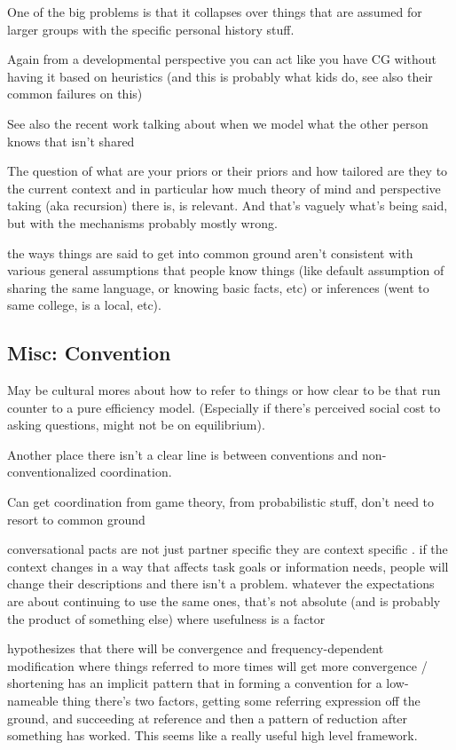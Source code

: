 \documentclass[]{article}
\begin{document}
One of the big problems is that it collapses over things that are assumed for larger groups with the specific personal history stuff. 



Again from a developmental perspective you can act like you have CG without having it based on heuristics (and this is probably what kids do, see also their common failures on this) 

See also the recent work talking about when we model what the other person knows that isn't shared 

The question of what are your priors or their priors and how tailored are they to the current context and in particular how much theory of mind and perspective taking (aka recursion) there is, is relevant. And that's vaguely what's being said, but with the mechanisms probably mostly wrong. 

the ways things are said to get into common ground aren't consistent with various general assumptions that people know things (like default assumption of sharing the same language, or knowing basic facts, etc) or inferences (went to same college, is a local, etc). 



\subsection{Misc: Convention}

May be cultural mores about how to refer to things or how clear to be that run counter to a pure efficiency model. (Especially if there's perceived social cost to asking questions, might not be on equilibrium). 


Another place there isn't a clear line is between conventions and non-conventionalized coordination. 

Can get coordination from game theory, from probabilistic stuff, don't need to resort to common ground

conversational pacts are not just partner specific they are context specific \cite{ibarra2016}. if the context changes in a way that affects task goals or information needs, people will change their descriptions and there isn't a problem. whatever the expectations are about continuing to use the same ones, that's not absolute (and is probably the product of something else) where usefulness is a factor 

\cite{krauss1964} hypothesizes that there will be convergence and frequency-dependent modification where things referred to more times will get more convergence / shortening
\cite{leung2023} has an implicit pattern that in forming a convention for a low-nameable thing there's two factors, getting some referring expression off the ground, and succeeding at reference and then a pattern of reduction after something has worked. This seems like a really useful high level framework. 
\end{document}
